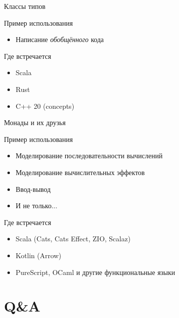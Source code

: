 \documentclass{beamer}
\begin{document}
\begin{frame}{Классы типов}
    \begin{block}{Пример использования}
        \begin{itemize}
            \item Написание \textit{обобщённого} кода
        \end{itemize}
    \end{block}
    \begin{block}{Где встречается}
        \begin{itemize}
            \item Scala
            \item Rust
            \item C++ 20 (concepts)
        \end{itemize}
    \end{block}
\end{frame}
\begin{frame}{Монады и их друзья}
    \begin{block}{Пример использования}
        \begin{itemize}
            \item Моделирование последовательности вычислений
            \item Моделирование вычислительных эффектов
            \item Ввод-вывод
            \item И не только...
        \end{itemize}
    \end{block}
    \begin{block}{Где встречается}
        \begin{itemize}
            \item Scala (Cats, Cats Effect, ZIO, Scalaz)
            \item Kotlin (Arrow)
            \item PureScript, OCaml и другие функциональные языки
        \end{itemize}
    \end{block}
\end{frame}
\section{Q\&A}
\end{document}

